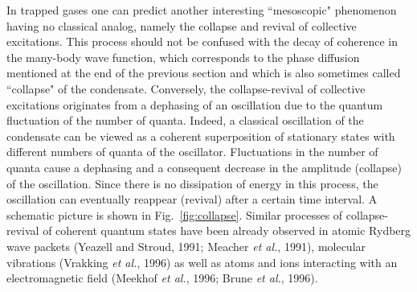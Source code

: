 In trapped gases one can predict another interesting
``mesoscopic"  phenomenon having no classical analog, namely the
collapse and revival of collective excitations. This process should
not be confused with the decay of coherence in the many-body wave
function, which corresponds to the phase diffusion mentioned at the end
of the previous section and which is also sometimes called ``collapse" of the
condensate. Conversely, the collapse-revival of collective excitations
originates  from a dephasing of an oscillation due to the quantum
fluctuation of the number of quanta. Indeed, a classical oscillation
of the condensate can  be viewed as a coherent superposition of
stationary  states  with different numbers of quanta of the oscillator.
Fluctuations  in the number of quanta cause a dephasing and a consequent
decrease in the amplitude (collapse) of the oscillation.  Since there
is no dissipation of energy in this process, the oscillation can
eventually  reappear (revival) after  a certain time interval.
A schematic picture is shown in
Fig.~\ref{fig:collapse}.  Similar processes of collapse-revival of
coherent quantum states have been already observed in atomic Rydberg
wave packets (Yeazell and Stroud, 1991; Meacher {\it et al.}, 1991),
molecular vibrations (Vrakking {\it et al.}, 1996) as well as atoms and
ions interacting with an electromagnetic field (Meekhof {\it et al.}, 
1996; Brune {\it et al.}, 1996).

